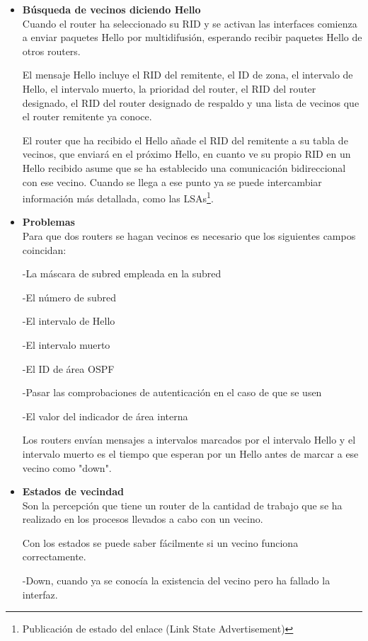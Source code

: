 \documentclass[a4paper,11pt]{article}
\begin{document}
\begin{itemize}
  \item \textbf{Búsqueda de vecinos diciendo Hello}\\
  Cuando el router ha seleccionado su RID y se activan las interfaces comienza a enviar paquetes Hello por multidifusión, esperando recibir paquetes Hello de otros routers.
  
  El mensaje Hello incluye el RID del remitente, el ID de zona, el intervalo de Hello, el intervalo muerto, la prioridad del router, el RID del router designado, el RID del router designado de respaldo y una lista de vecinos que el router remitente ya conoce.
  
  El router que ha recibido el Hello añade el RID del remitente a su tabla de vecinos, que enviará en el próximo Hello, en cuanto ve su propio RID en un Hello recibido asume que se ha establecido una comunicación bidireccional con ese vecino. Cuando se llega a ese punto ya se puede intercambiar información más detallada, como las LSAs\footnote{Publicación de estado del enlace (Link State Advertisement)}. 
  \item \textbf{Problemas}\\
  Para que dos routers se hagan vecinos es necesario que los siguientes campos coincidan:
  
  -La máscara de subred empleada en la subred
  
  -El número de subred
  
  -El intervalo de Hello
  
  -El intervalo muerto
  
  -El ID de área OSPF
  
  -Pasar las comprobaciones de autenticación en el caso de que se usen
  
  -El valor del indicador de área interna
  
  Los routers envían mensajes a intervalos marcados por el intervalo Hello y el intervalo muerto es el tiempo que esperan por un Hello antes de marcar a ese vecino como "down".
  
  \item \textbf{Estados de vecindad}\\
  Son la percepción que tiene un router de la cantidad de trabajo que se ha realizado en los procesos llevados a cabo con un vecino.
  
  Con los estados se puede saber fácilmente si un vecino funciona correctamente.
  
  -Down, cuando ya se conocía la existencia del vecino pero ha fallado la interfaz.
  

\end{itemize}
\end{document}
